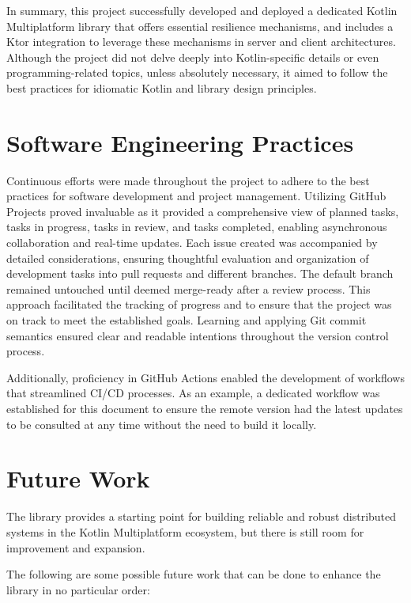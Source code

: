 In summary, this project successfully developed and deployed a dedicated Kotlin Multiplatform library that offers essential resilience mechanisms, and includes a Ktor integration to leverage these mechanisms in server and client architectures.
Although the project did not delve deeply into Kotlin-specific details or even programming-related topics, unless
absolutely necessary, it aimed to follow the best practices for idiomatic Kotlin and library design principles.


\section{Software Engineering Practices}\label{sec:software-engineering-practices}

Continuous efforts were made throughout the project
to adhere to the best practices for software development and project management.
Utilizing GitHub Projects proved invaluable as it provided a comprehensive view of planned tasks,
tasks in progress, tasks in review, and tasks completed, enabling asynchronous collaboration and real-time updates.
Each issue created was accompanied by detailed considerations,
ensuring thoughtful evaluation and organization of development tasks into pull requests and different branches.
The default branch remained untouched until deemed merge-ready after a review process.
This approach facilitated the tracking of progress
and to ensure that the project was on track to meet the established goals.
Learning and applying Git commit semantics ensured clear and readable intentions throughout the version control process.

Additionally, proficiency in GitHub Actions enabled the development of workflows that streamlined CI/CD processes.
As an example,
a dedicated workflow was established for this document
to ensure the remote version had the latest updates to be consulted at any time without the need to build it locally.


\section{Future Work}\label{sec:future-work}

The library provides a starting point for building reliable and robust distributed systems in the Kotlin Multiplatform ecosystem, but there is still room for improvement and expansion.

The following are some possible future work that can be done to enhance the library in no particular order:

